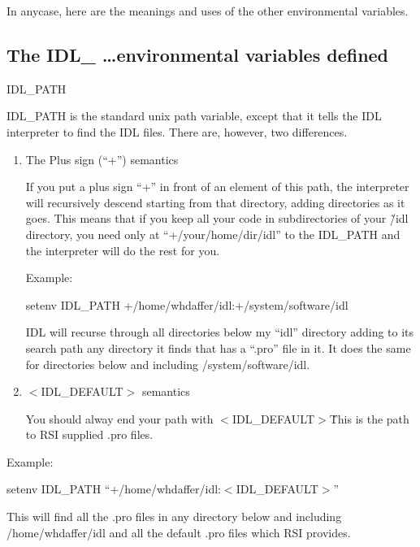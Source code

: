   In anycase, here are the meanings and uses of the other
  environmental variables.

\subsection{The IDL\_ \ldots environmental variables defined}\label{sec:qs-env-variables-specifics}
 
   \bi 
    \item IDL\_PATH

     IDL\_PATH is the standard unix path variable, except that it
     tells the IDL interpreter to find the IDL files. There are,
     however, two differences.
        
     \begin{enumerate}
       \item The Plus sign  (``+'') semantics

         If you put a plus sign ``+'' in front of an element of this
         path, the interpreter will recursively descend starting
         from that directory, adding directories as it goes. This
         means that if you keep all your code in subdirectories of your \~/idl
         directory, you need only at ``+/your/home/dir/idl'' to the
         IDL\_PATH and the interpreter will do the rest for you.

        Example:

        setenv IDL\_PATH +/home/whdaffer/idl:+/system/software/idl

         IDL will recurse through all directories below my ``idl''
	     directory adding to its search path any directory it finds
	     that has a ``.pro'' file in it. It does the same for
	     directories below and including /system/software/idl.
        
      \item $<$IDL\_DEFAULT$>$ semantics

        You should alway end your path with $<$IDL\_DEFAULT$>$\.
        This is the path to RSI supplied .pro files. 

     \end{enumerate}

     Example: 

       setenv IDL\_PATH ``+/home/whdaffer/idl:$<$IDL\_DEFAULT$>$''

     This will find all the .pro files in any directory below and
     including /home/whdaffer/idl and all the default .pro files which
     RSI provides.
  
